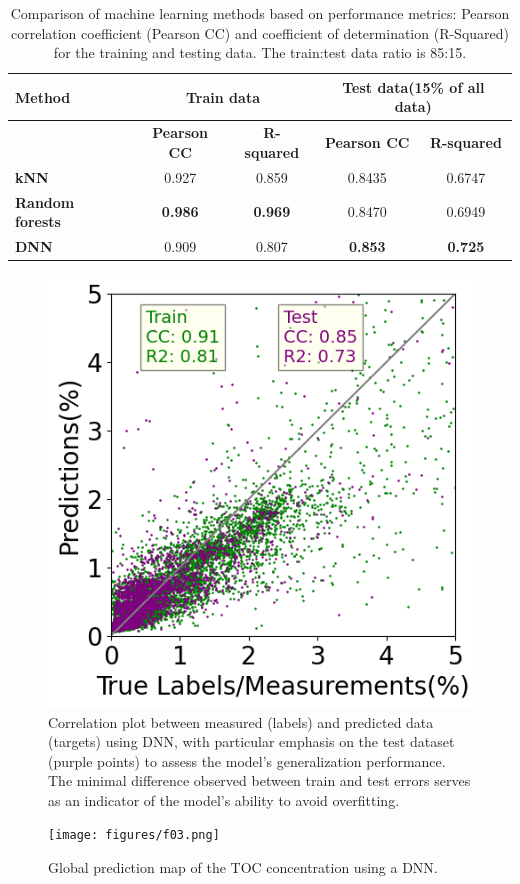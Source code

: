 \documentclass[journal abbreviation, manuscript]{copernicus}
\begin{document}
\begin{table}[h]
  \centering
  \begin{tabular}{|l|c|c|c|c|}
    \hline
    \textbf{Method} & \multicolumn{2}{c|}{\textbf{Train data}} & \multicolumn{2}{c|}{\textbf{Test data(15\% of all data)}} \\
    \hline
           & \textbf{Pearson CC} & \textbf{R-squared} & \textbf{Pearson CC} & \textbf{R-squared} \\
    \hline
    \textbf{kNN} & 0.927 & 0.859 & 0.8435 & 0.6747 \\
    \hline
    \textbf{Random forests} & \textbf{0.986} & \textbf{ 0.969} & 0.8470 & 0.6949 \\
    \hline
    \textbf{DNN} & 0.909 & 0.807 & \textbf{0.853} & \textbf{0.725} \\
    \hline
  \end{tabular}
    \caption{Comparison of machine learning methods based on performance metrics: Pearson correlation coefficient (Pearson CC) and coefficient of determination (R-Squared) for the training and testing data. The train:test data ratio is 85:15.}
  \label{tab:kNNRF}
\end{table}





\begin{figure}
    \centering
    \includegraphics[width = 4.3 cm]{figures/f02.png}
    \caption{Correlation plot between measured (labels) and predicted data (targets) using DNN, with particular emphasis on the test dataset (purple points) to assess the model's generalization performance. The minimal difference observed between train and test errors serves as an indicator of the model's ability to avoid overfitting.}
    \label{fig:correlationPlot}
\end{figure}



\begin{figure}
        \centering
        \texttt{[image: figures/f03.png]}
        \caption{Global prediction map of the TOC concentration using a DNN.}
        \label{fig:tocPercent}
\end{figure}
\end{document}
